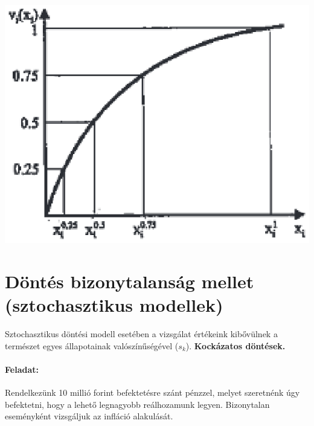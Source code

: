 \documentclass[a4paper,12pt]{article}
\begin{document}
\begin{center}

\includegraphics[scale=0.7]{valuesample}
\\
\end{center}


\section{Döntés bizonytalanság mellet (sztochasztikus modellek)}

Sztochasztikus döntési modell esetében a vizsgálat értékeink kibővülnek a természet egyes állapotainak valószínűségével ($s_k$). \textbf{Kockázatos döntések.}

\paragraph{Feladat:} Rendelkezünk 10 millió forint befektetésre szánt pénzzel, melyet szeretnénk úgy befektetni, hogy a lehető legnagyobb reálhozamunk legyen. Bizonytalan eseményként vizsgáljuk az infláció alakulását.
\end{document}
